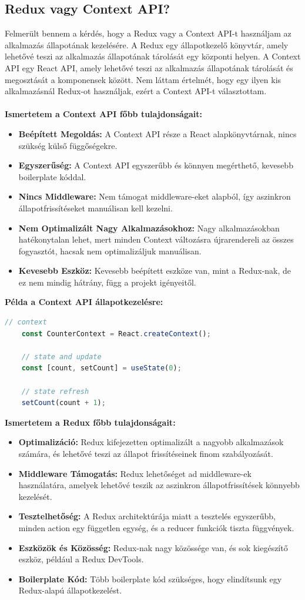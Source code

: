 \subsection*{Redux vagy Context API?}
Felmerült bennem a kérdés, hogy a Redux vagy a Context API-t használjam az alkalmazás állapotának kezelésére.
A Redux egy állapotkezelő könyvtár, amely lehetővé teszi az alkalmazás állapotának tárolását egy központi helyen.
A Context API egy React API, amely lehetővé teszi az alkalmazás állapotának tárolását és megosztását a komponensek között.
Nem láttam értelmét, hogy egy ilyen kis alkalmazásnál Redux-ot használjak, ezért a Context API-t választottam.
\\
\\
\textbf{Ismertetem a Context API főbb tulajdonságait:}
\begin{itemize}
    \item \textbf{Beépített Megoldás:} A Context API része a React alapkönyvtárnak, nincs szükség külső függőségekre.
    \item \textbf{Egyszerűség:} A Context API egyszerűbb és könnyen megérthető, kevesebb boilerplate kóddal.
    \item \textbf{Nincs Middleware:} Nem támogat middleware-eket alapból, így aszinkron állapotfrissítéseket manuálisan kell kezelni.
    \item \textbf{Nem Optimalizált Nagy Alkalmazásokhoz:} Nagy alkalmazásokban hatékonytalan lehet, mert minden Context változásra újrarendereli az összes fogyasztót, hacsak nem optimalizáljuk manuálisan.
    \item \textbf{Kevesebb Eszköz:} Kevesebb beépített eszköze van, mint a Redux-nak, de ez nem mindig hátrány, függ a projekt igényeitől.
\end{itemize}
\textbf{Példa a Context API állapotkezelésre:}
\begin{lstlisting}[language=JavaScript]
    // context
    const CounterContext = React.createContext();
    
    // state and update
    const [count, setCount] = useState(0);
    
    // state refresh
    setCount(count + 1);
\end{lstlisting}
\textbf{Ismertetem a Redux főbb tulajdonságait:}
\begin{itemize}
    \item \textbf{Optimalizáció:} Redux kifejezetten optimalizált a nagyobb alkalmazások számára, és lehetővé teszi az állapot frissítéseinek finom szabályozását.
    \item \textbf{Middleware Támogatás:} Redux lehetőséget ad middleware-ek használatára, amelyek lehetővé teszik az aszinkron állapotfrissítések könnyebb kezelését.
    \item \textbf{Tesztelhetőség:} A Redux architektúrája miatt a tesztelés egyszerűbb, minden action egy független egység, és a reducer funkciók tiszta függvények.
    \item \textbf{Eszközök és Közösség:} Redux-nak nagy közössége van, és sok kiegészítő eszköz, például a Redux DevTools.
    \item \textbf{Boilerplate Kód:} Több boilerplate kód szükséges, hogy elindítsunk egy Redux-alapú állapotkezelést.
\end{itemize}

